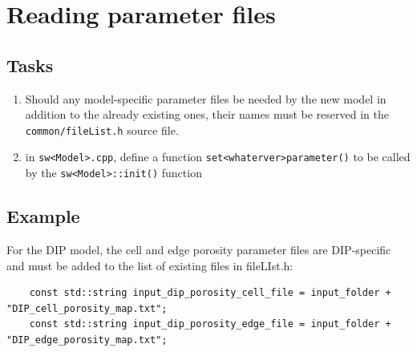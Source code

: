 \section{Reading parameter files}
%
%
%
\subsection{Tasks}
\begin{enumerate}
\item Should any model-specific parameter files be needed by the new model in addition to the already existing ones, their names must be reserved in the \texttt{common/fileList.h} source file.
\item in \texttt{sw<Model>.cpp}, define a function \texttt{set<whaterver>parameter()} to be called by the \texttt{sw<Model>::init()} function
\end{enumerate}

%
%
%
\subsection{Example}
For the DIP model, the cell and edge porosity parameter files are DIP-specific and must be added to the list of existing files in fileLIst.h:
\begin{lstlisting}
    const std::string input_dip_porosity_cell_file = input_folder + "DIP_cell_porosity_map.txt";
    const std::string input_dip_porosity_edge_file = input_folder + "DIP_edge_porosity_map.txt";
\end{lstlisting}
%
%
%
%

